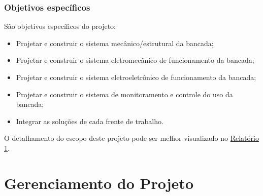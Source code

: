    \subsection{Objetivos específicos}
       São objetivos específicos do projeto:
       \begin{itemize}

        \item Projetar e construir o sistema mecânico/estrutural da bancada;
        \item Projetar e construir o sistema eletromecânico de funcionamento da bancada;
        \item Projetar e construir o sistema eletroeletrônico de funcionamento da bancada;
        \item Projetar e construir o sistema de monitoramento e controle do uso da bancada;
        \item Integrar as soluções de cada frente de trabalho.
       \end{itemize}

	O detalhamento do escopo deste projeto pode ser melhor visualizado no \href{https://drive.google.com/file/d/0B5InkGKx6O-MR1B3eVYzZFpjQ3c/view?usp=sharing}{Relatório 1}. 
       
% 

\chapter{Gerenciamento do Projeto}

